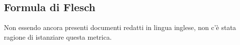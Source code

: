 \documentclass[PianoDiQualifica.tex]{subfiles}
\begin{document}
\subsection{Formula di Flesch}
Non essendo ancora presenti documenti redatti in lingua inglese, non c'è stata ragione di istanziare questa metrica.
	


\end{document}
